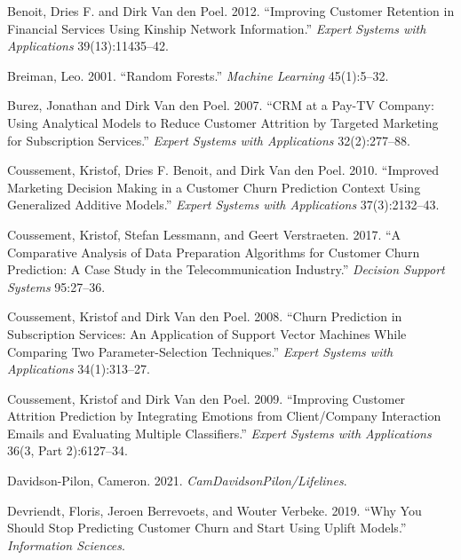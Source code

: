 \documentclass[
  12pt,
]{article}
\newlength{\cslhangindent}
\newlength{\cslentryspacingunit} %
\newenvironment{CSLReferences}[2] %
 {%
  \setlength{\parindent}{0pt}
  \ifodd #1
  \let\oldpar\par
  \def\par{\hangindent=\cslhangindent\oldpar}
  \fi
  \setlength{\parskip}{#2\cslentryspacingunit}
 }%
 {}
\begin{document}
\begin{CSLReferences}{1}{0}
\leavevmode{}%
Benoit, Dries F. and Dirk Van den Poel. 2012. {``Improving Customer Retention in Financial Services Using Kinship Network Information.''} \emph{Expert Systems with Applications} 39(13):11435--42.

\leavevmode{}%
Breiman, Leo. 2001. {``Random Forests.''} \emph{Machine Learning} 45(1):5--32.

\leavevmode{}%
Burez, Jonathan and Dirk Van den Poel. 2007. {``{CRM} at a Pay-{TV} Company: {Using} Analytical Models to Reduce Customer Attrition by Targeted Marketing for Subscription Services.''} \emph{Expert Systems with Applications} 32(2):277--88.

\leavevmode{}%
Coussement, Kristof, Dries F. Benoit, and Dirk Van den Poel. 2010. {``Improved Marketing Decision Making in a Customer Churn Prediction Context Using Generalized Additive Models.''} \emph{Expert Systems with Applications} 37(3):2132--43.

\leavevmode{}%
Coussement, Kristof, Stefan Lessmann, and Geert Verstraeten. 2017. {``A Comparative Analysis of Data Preparation Algorithms for Customer Churn Prediction: {A} Case Study in the Telecommunication Industry.''} \emph{Decision Support Systems} 95:27--36.

\leavevmode{}%
Coussement, Kristof and Dirk Van den Poel. 2008. {``Churn Prediction in Subscription Services: {An} Application of Support Vector Machines While Comparing Two Parameter-Selection Techniques.''} \emph{Expert Systems with Applications} 34(1):313--27.

\leavevmode{}%
Coussement, Kristof and Dirk Van den Poel. 2009. {``Improving Customer Attrition Prediction by Integrating Emotions from Client/Company Interaction Emails and Evaluating Multiple Classifiers.''} \emph{Expert Systems with Applications} 36(3, Part 2):6127--34.

\leavevmode{}%
Davidson-Pilon, Cameron. 2021. \emph{CamDavidsonPilon/Lifelines}.

\leavevmode{}%
Devriendt, Floris, Jeroen Berrevoets, and Wouter Verbeke. 2019. {``Why You Should Stop Predicting Customer Churn and Start Using Uplift Models.''} \emph{Information Sciences}.


\end{CSLReferences}
\end{document}
